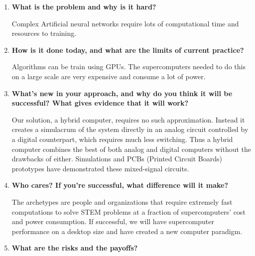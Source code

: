 \documentclass[12pt]{article}
\begin{document}
    \begin{enumerate}\large
        \item[\UUno]     
            \textbf{What is the problem and why is it hard?} \par
            
            Complex Artificial neural networks require lots of computational time and resources to training. 
            \par
        \item[\DDos]     
            \textbf{How is it done today, and what are the limits of current practice?} \par
            
            Algorithms can be train using GPUs. The supercomputers needed to do this on a large scale are 
            very expensive and consume a lot of power.
            \par
        \item[\TTres]    
            \textbf{What's new in your approach, 
            and why do you think it will be successful? 
            What gives evidence that it will work?} \par
            
            Our solution, a hybrid computer, requires no such approximation. Instead 
            it creates a simulacrum of the system directly in an analog circuit
            controlled by a digital counterpart, which requires much less switching. 
            Thus a hybrid computer combines the best
            of both analog and digital computers without the drawbacks of either.
            Simulations and PCBs (Printed Circuit Boards) prototypes have 
            demonstrated these mixed-signal circuits.
            \par
        \item[\CCuatro]  
            \textbf{Who cares? 
            If you're successful, what difference will it make?} \par
            
            The archetypes are people and organizations that require extremely fast 
            computations to solve STEM problems at a fraction of supercomputers' 
            cost and power consumption.
            If successful, we will have supercomputer performance on a desktop
            size and have created a new computer paradigm.
            \par
        \item[\CCinco]   
            \textbf{What are the risks and the payoffs?} \par
            

\end{enumerate}
\end{document}
